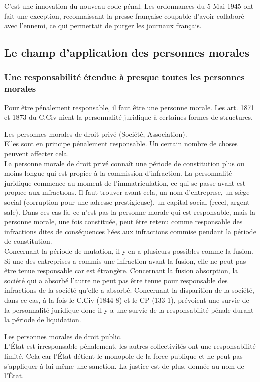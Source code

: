 \documentclass[10pt, a4paper, openany]{book}
\begin{document}
C'est une innovation du nouveau code pénal. Les ordonnances du 5 Mai 1945 ont fait une exception, reconnaissant la presse française coupable d'avoir collaboré avec l'ennemi, ce qui permettait de purger les journaux français. 

\subsection{Le champ d'application des personnes morales}

\subsubsection{Une responsabilité étendue à presque toutes les personnes morales}

Pour être pénalement responsable, il faut être une personne morale. Les art. 1871 et 1873 du C.Civ nient la personnalité juridique à certaines formes de structures. 


Les personnes morales de droit privé (Société, Association). \\
Elles sont en principe pénalement responsable. Un certain nombre de choses peuvent affecter cela. \\
La personne morale de droit privé connaît une période de constitution plus ou moins longue qui est propice à la commission d'infraction. La personnalité juridique commence au moment de l'immatriculation, ce qui se passe avant est propice aux infractions. Il faut trouver avant cela, un nom d'entreprise, un siège social (corruption pour une adresse prestigieuse), un capital social (recel, argent sale). Dans ces cas là, ce n'est pas la personne morale qui est responsable, mais la personne morale, une fois constituée, peut être retenu comme responsable des infractions dites de conséquences liées aux infractions commise pendant la période de constitution. \\
Concernant la période de mutation, il y en a plusieurs possibles comme la fusion. Si une des entreprises a commis une infraction avant la fusion, elle ne peut pas être tenue responsable car est étrangère. Concernant la fusion absorption, la société qui a absorbé l'autre ne peut pas être tenue pour responsable des infractions de la société qu'elle a absorbé. Concernant la disparition de la société, dans ce cas, à la fois le C.Civ (1844-8) et le CP (133-1), prévoient une survie de la personnalité juridique donc il y a une survie de la responsabilité pénale durant la période de liquidation. 


Les personnes morales de droit public. \\
L'État est irresponsable pénalement, les autres collectivités ont une responsabilité limité. Cela car l'État détient le monopole de la force publique et ne peut pas s'appliquer à lui même une sanction. La justice est de plus, donnée au nom de l'État. 
\end{document}

